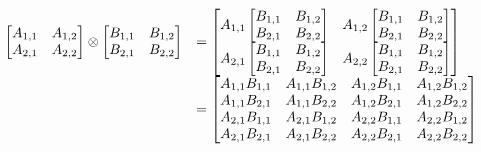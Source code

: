 \documentclass[authoryearcitations]{UoYCSproject}
\begin{document}
\begin{equation}
\begin{array}{r l}
\setlength{\jot}{9pt}
\begin{bmatrix}
        A_{1,1} & A_{1,2} \\
        A_{2,1} & A_{2,2} \\
\end{bmatrix} \otimes
\begin{bmatrix}
        B_{1,1} & B_{1,2} \\
        B_{2,1} & B_{2,2} \\
\end{bmatrix} &= \begin{bmatrix}
                    A_{1,1} \begin{bmatrix}
                             B_{1,1} & B_{1,2} \\
                             B_{2,1} & B_{2,2} \\
                             \end{bmatrix} & A_{1,2} \begin{bmatrix}
                                                      B_{1,1} & B_{1,2} \\
                                                      B_{2,1} & B_{2,2} \\
                                                     \end{bmatrix} \\
 
                    A_{2,1} \begin{bmatrix}
                             B_{1,1} & B_{1,2} \\
                             B_{2,1} & B_{2,2} \\
                             \end{bmatrix} & A_{2,2} \begin{bmatrix}
                                                      B_{1,1} & B_{1,2} \\
                                                      B_{2,1} & B_{2,2} \\
                                                     \end{bmatrix} \\

                \end{bmatrix} \\
              & = \begin{bmatrix}
                    A_{1,1}B_{1,1} & A_{1,1}B_{1,2} & A_{1,2}B_{1,1} & A_{1,2}B_{1,2} \\
                    A_{1,1}B_{2,1} & A_{1,1}B_{2,2} & A_{1,2}B_{2,1} & A_{1,2}B_{2,2} \\
                    A_{2,1}B_{1,1} & A_{2,1}B_{1,2} & A_{2,2}B_{1,1} & A_{2,2}B_{1,2} \\
                    A_{2,1}B_{2,1} & A_{2,1}B_{2,2} & A_{2,2}B_{2,1} & A_{2,2}B_{2,2} \\
                   \end{bmatrix}
\end{array}
\label{eq:tensorDef}
\end{equation}
\end{document}
